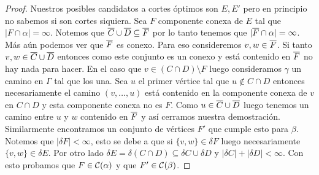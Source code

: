 \documentclass[tesis.tex]{subfiles}
\begin{document}
\begin{proof}
	
%	
	
	Nuestros posibles candidatos a cortes óptimos son $E,E'$ pero en principio no sabemos si son cortes siquiera.
	Sea $F$ componente conexa de $E$ tal que $|F \cap \alpha| = \infty$.
	Notemos que $\overline C \cup \overline D \subseteq \overline F$ por lo tanto tenemos que $|\overline F \cap \alpha|=\infty$.
	Más aún podemos ver que $\overline F$ es conexo.
	Para eso consideremos $v,w \in \overline F$.
	Si tanto $v,w \in \overline C \cup \overline D$ entonces como este conjunto es un conexo y está contenido en $\overline F$ no hay nada para hacer.
	En el caso que $v \in (C \cap D) \setminus F$ luego consideramos $\gamma$ un camino en $\Gamma$ tal que los una.
	Sea $u$ el primer vértice tal que $u \notin C \cap D$ entonces necesariamente el camino $(v, \dots, u)$ está contenido en la componente conexa de $v$ en $C \cap D$ y esta componente conexa no es $F$. 
	Como $u \in \overline C \cup \overline D$ luego tenemos un camino entre $u$ y $w$ contenido en $\overline F$ y así cerramos nuestra demostración.
	Similarmente encontramos un conjunto de vértices $F'$ que cumple esto para $\beta$.
	Notemos que $|\delta F| < \infty$, esto se debe a que si $\{ v,w \} \in \delta F$ luego necesariamente $\{v,w\} \in \delta E$.
	Por otro lado $\delta E = \delta (C \cap D)  \subseteq \delta C \cup \delta D$ y $|\delta C| + |\delta D| < \infty$. 
	Con esto probamos que $F \in {\cal C}(\alpha)$ y que $F' \in {\cal C}(\beta)$.
	

\end{proof}
\end{document}
